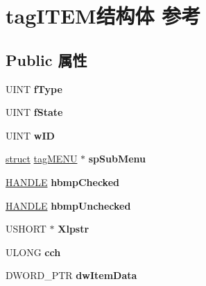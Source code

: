 \hypertarget{structtag_i_t_e_m}{}\section{tag\+I\+T\+E\+M结构体 参考}
\label{structtag_i_t_e_m}
\subsection*{Public 属性}
\begin{DoxyCompactItemize}
\item 
\mbox{\label{structtag_i_t_e_m_a8dc187bd9bd10f748b9ecb597909dd09}} 
U\+I\+NT {\bfseries f\+Type}
\item 
\mbox{\label{structtag_i_t_e_m_a9152c04928463274cfeb7f88f32e72e5}} 
U\+I\+NT {\bfseries f\+State}
\item 
\mbox{\label{structtag_i_t_e_m_a319f8c9a0af494fe54c029a954e092b3}} 
U\+I\+NT {\bfseries w\+ID}
\item 
\mbox{\label{structtag_i_t_e_m_ab5aa73cd9d3f3ebfeb70937847807cfe}} 
\hyperlink{interfacestruct}{struct} \hyperlink{structtag_m_e_n_u}{tag\+M\+E\+NU} $\ast$ {\bfseries sp\+Sub\+Menu}
\item 
\mbox{\label{structtag_i_t_e_m_a1b90df47d0b85f64d181366c725dc49f}} 
\hyperlink{interfacevoid}{H\+A\+N\+D\+LE} {\bfseries hbmp\+Checked}
\item 
\mbox{\label{structtag_i_t_e_m_abcb41010fa814bceacff669ca7c3843d}} 
\hyperlink{interfacevoid}{H\+A\+N\+D\+LE} {\bfseries hbmp\+Unchecked}
\item 
\mbox{\label{structtag_i_t_e_m_a8fd44ce1148f6d516a341488486c30fa}} 
U\+S\+H\+O\+RT $\ast$ {\bfseries Xlpstr}
\item 
\mbox{\label{structtag_i_t_e_m_ad943ee953fd98627c45e39703b078cd3}} 
U\+L\+O\+NG {\bfseries cch}
\item 
\mbox{\label{structtag_i_t_e_m_a3073449daad4db6cec868e6b0c94fa33}} 
D\+W\+O\+R\+D\+\_\+\+P\+TR {\bfseries dw\+Item\+Data}

\end{DoxyCompactItemize}
